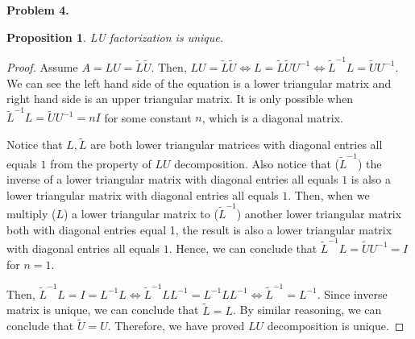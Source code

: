 \documentclass{article}
\newtheorem{prop}[thm]{Proposition}
\begin{document}
\textbf{Problem 4.}
\begin{prop}
    LU factorization is unique.
\end{prop}
\begin{proof}
    Assume  $A = LU = \tilde{L}\tilde{U}$.
    Then, $LU = \tilde{L}\tilde{U} \Leftrightarrow L = \tilde{L}\tilde{U}U^{-1} \Leftrightarrow \tilde{L}^{-1}L = \tilde{U}U^{-1}$.
    We can see the left hand side of the equation is a lower triangular matrix and right hand side is an upper triangular matrix. 
    It is only possible when $\tilde{L}^{-1}L = \tilde{U}U^{-1} = nI$ for some constant $n$, which is a diagonal matrix.

    Notice that $L,\tilde{L}$ are both lower triangular matrices with diagonal entries all equals $1$ from the property of $LU$ decomposition.
    Also notice that ($\tilde{L}^{-1}$) the inverse of a lower triangular matrix with diagonal entries all equals $1$ is also a lower triangular matrix with diagonal entries all equals $1$.
    Then, when we multiply ($L$) a lower triangular matrix to ($\tilde{L}^{-1}$) another lower triangular matrix both with diagonal entries equal 1, the result is also a lower triangular matrix with diagonal entries all equals $1$.
    Hence, we can conclude that $\tilde{L}^{-1}L=\tilde{U}U^{-1}=I$ for $n=1$.

    Then, $\tilde{L}^{-1}L=I=L^{-1}L\Leftrightarrow\tilde{L}^{-1}LL^{-1}=L^{-1}LL^{-1}\Leftrightarrow\tilde{L}^{-1}=L^{-1}$. 
    Since inverse matrix is unique, we can conclude that $\tilde{L}=L$.
    By similar reasoning, we can conclude that $\tilde{U}=U$.
    Therefore, we have proved $LU$ decomposition is unique.
\end{proof}
\bigbreak
\end{document}
